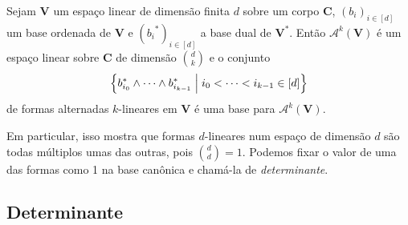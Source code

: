 


\begin{prop}
Sejam $\bm V$ um espaço linear de dimensão finita $d$ sobre um corpo $\bm C$, $(b_i)_{i \in [d]}$ um base ordenada de $\bm V$ e $({b_i}^*)_{i \in [d]}$ a base dual de $\bm{V^*}$. Então $\mathcal{A}^k(\bm V)$ é um espaço linear sobre $\bm C$ de dimensão $\binom{d}{k}$ e o conjunto
	\begin{equation*}
	\left\{b_{i_0}^* \wedge \cdots \wedge b_{i_{k-1}}^* \;\middle\vert\; i_0 < \cdots < i_{k-1} \in [d] \right\}
	\end{equation*}
de formas alternadas $k$-lineares em $\bm V$ é uma base para $\mathcal{A}^k(\bm V)$.
\end{prop}

Em particular, isso mostra que formas $d$-lineares num espaço de dimensão $d$ são todas múltiplos umas das outras, pois $\binom{d}{d}=1$. Podemos fixar o valor de uma das formas como 1 na base canônica e chamá-la de \emph{determinante}.

\subsection{Determinante}

